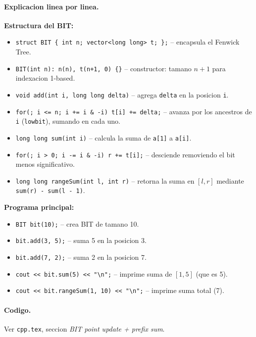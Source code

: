 \paragraph{Explicacion linea por linea.}
\textbf{Estructura del BIT:}
\begin{itemize}\setlength\itemsep{0pt}
	\item \verb|struct BIT { int n; vector<long long> t; };| -- encapsula el Fenwick Tree.
	\item \verb|BIT(int n): n(n), t(n+1, 0) {}| -- constructor: tamano $n+1$ para indexacion 1-based.
	\item \verb|void add(int i, long long delta)| -- agrega \texttt{delta} en la posicion \texttt{i}.
	\item \verb|for(; i <= n; i += i & -i) t[i] += delta;| -- avanza por los ancestros de \texttt{i} (\texttt{lowbit}), sumando en cada uno.
	\item \verb|long long sum(int i)| -- calcula la suma de \texttt{a[1]} a \texttt{a[i]}.
	\item \verb|for(; i > 0; i -= i & -i) r += t[i];| -- desciende removiendo el bit menos significativo.
	\item \verb|long long rangeSum(int l, int r)| -- retorna la suma en $[l, r]$ mediante \texttt{sum(r) - sum(l - 1)}.
\end{itemize}
\textbf{Programa principal:}
\begin{itemize}\setlength\itemsep{0pt}
	\item \verb|BIT bit(10);| -- crea BIT de tamano 10.
	\item \verb|bit.add(3, 5);| -- suma 5 en la posicion 3.
	\item \verb|bit.add(7, 2);| -- suma 2 en la posicion 7.
	\item \verb|cout << bit.sum(5) << "\n";| -- imprime suma de $[1, 5]$ (que es 5).
	\item \verb|cout << bit.rangeSum(1, 10) << "\n";| -- imprime suma total (7).
\end{itemize}

\paragraph{Codigo.}
Ver \texttt{cpp.tex}, seccion \textit{BIT point update + prefix sum}.

\vspace{0.5em}

